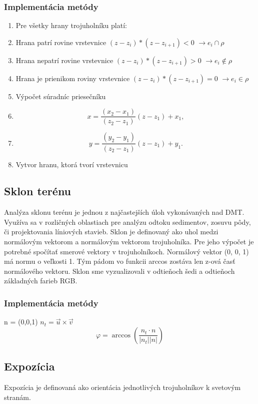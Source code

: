 \documentclass[12pt]{article}
\begin{document}
\subsubsection{Implementácia metódy}
\begin{enumerate}
\item Pre všetky hrany trojuholníku platí:
\item Hrana patrí rovine vrstevnice  $(z-z_i)*(z-z_{i+1}) < 0$  $\longrightarrow e_i \cap \rho$
\item Hrana nepatrí rovine vrstevnice $(z-z_i)*(z-z_{i+1}) > 0$  $\longrightarrow e_i \notin \rho$ 
\item Hrana je prienikom roviny vrstevnice $(z-z_i)*(z-z_{i+1}) = 0$  $\longrightarrow e_i \in \rho$
\item  \hspace {1.5cm} Výpočet súradníc priesečníku 
\item  \hspace {1.5cm} $$ x = \frac{(x_2-x_1)}{(z_2-z_1)}(z-z_1)+x_1, $$
\item  \hspace {1.5cm} $$ y = \frac{(y_2-y_1)}{(z_2-z_1)}(z-z_1)+y_1.$$
\item Vytvor hranu, ktorá tvorí vrstevnicu
\end{enumerate}

\subsection {Sklon terénu}
Analýza sklonu terénu je jednou z najčastejších úloh vykonávaných nad DMT. Využíva sa v rozličných oblastiach pre analýzu odtoku sedimentov, zosuvu pôdy, či projektovania líniových stavieb. Sklon je definovaný ako uhol medzi normálovým vektorom a normálovým vektorom trojuholníka. Pre jeho výpočet je potrebné spočítať smerové vektory v trojuholníkoch. Normálový vektor (0, 0, 1) má normu o veľkosti 1. Tým pádom vo funkcii arccos zostáva len z-ová časť normálového vektoru. Sklon sme vyzualizovali v odtieňoch šedi a odtieňoch základných farieb RGB.

\subsubsection{Implementácia metódy}
n = (0,0,1)
\newline $n_t = \vec{u}\times \vec{v}$
$$\varphi =\arccos(\frac{n_t \cdot n}{|n_t| |n|})$$

\subsection {Expozícia}
Expozícia je definovaná ako orientácia jednotlivých trojuholníkov k svetovým stranám.
\end{document}
